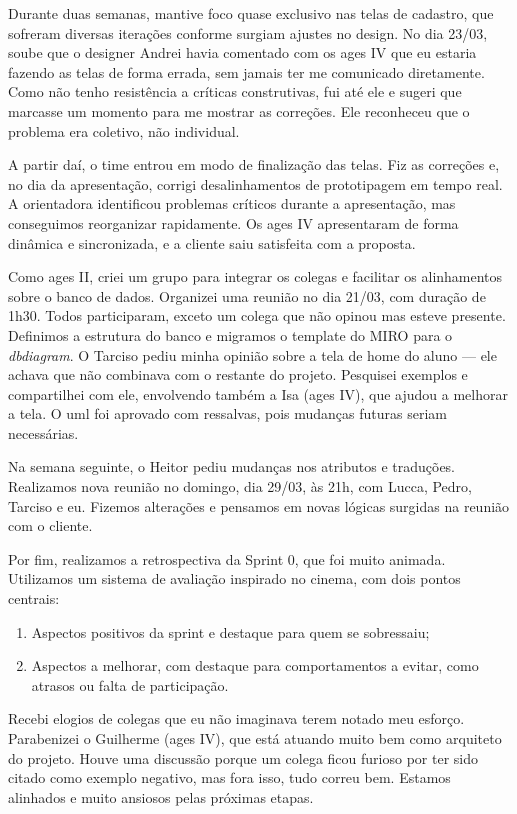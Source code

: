 Durante duas semanas, mantive foco quase exclusivo nas telas de cadastro, que sofreram
diversas iterações conforme surgiam ajustes no design. No dia 23/03, soube que o
designer Andrei havia comentado com os \ac{ages} IV que eu estaria fazendo as telas de
forma errada, sem jamais ter me comunicado diretamente. Como não tenho resistência a
críticas construtivas, fui até ele e sugeri que marcasse um momento para me mostrar as
correções. Ele reconheceu que o problema era coletivo, não individual.

A partir daí, o time entrou em modo de finalização das telas. Fiz as correções e, no
dia da apresentação, corrigi desalinhamentos de prototipagem em tempo real. A
orientadora identificou problemas críticos durante a apresentação, mas conseguimos
reorganizar rapidamente. Os \ac{ages} IV apresentaram de forma dinâmica e sincronizada, e
a cliente saiu satisfeita com a proposta.

Como \ac{ages} II, criei um grupo para integrar os colegas e facilitar os alinhamentos
sobre o banco de dados. Organizei uma reunião no dia 21/03, com duração de 1h30.
Todos participaram, exceto um colega que não opinou mas esteve presente. Definimos
a estrutura do banco e migramos o template do MIRO para o \textit{dbdiagram}. O
Tarciso pediu minha opinião sobre a tela de home do aluno --- ele achava que não
combinava com o restante do projeto. Pesquisei exemplos e compartilhei com ele,
envolvendo também a Isa (\ac{ages} IV), que ajudou a melhorar a tela. O \ac{uml} foi
aprovado com ressalvas, pois mudanças futuras seriam necessárias.

Na semana seguinte, o Heitor pediu mudanças nos atributos e traduções. Realizamos
nova reunião no domingo, dia 29/03, às 21h, com Lucca, Pedro, Tarciso e eu. Fizemos
alterações e pensamos em novas lógicas surgidas na reunião com o cliente.

Por fim, realizamos a retrospectiva da Sprint 0, que foi muito animada. Utilizamos um
sistema de avaliação inspirado no cinema, com dois pontos centrais:

\begin{enumerate}
  \item Aspectos positivos da sprint e destaque para quem se sobressaiu;
  \item Aspectos a melhorar, com destaque para comportamentos a evitar, como atrasos
    ou falta de participação.
\end{enumerate}

Recebi elogios de colegas que eu não imaginava terem notado meu esforço. Parabenizei
o Guilherme (\ac{ages} IV), que está atuando muito bem como arquiteto do projeto. Houve
uma discussão porque um colega ficou furioso por ter sido citado como exemplo negativo,
mas fora isso, tudo correu bem. Estamos alinhados e muito ansiosos pelas próximas etapas.
